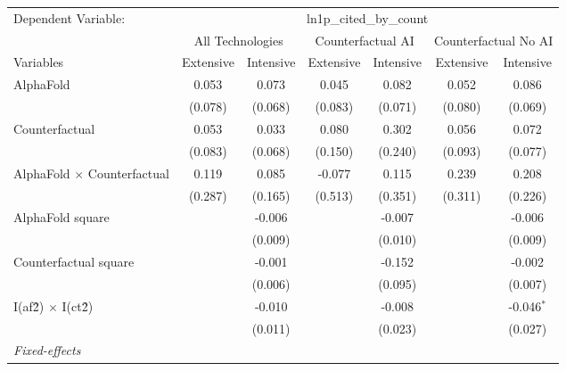 \begingroup
\centering
\begin{tabular}{lcccccc}
   \tabularnewline \midrule \midrule
   Dependent Variable: & \multicolumn{6}{c}{ln1p\_cited\_by\_count}\\
 & \multicolumn{2}{c}{All Technologies} & \multicolumn{2}{c}{Counterfactual AI} & \multicolumn{2}{c}{Counterfactual No AI} \\
\cmidrule(lr){1-1}\cmidrule(lr){2-3} \cmidrule(lr){4-5} \cmidrule(lr){6-7}
Variables & \multicolumn{1}{c}{Extensive} & \multicolumn{1}{c}{Intensive} & \multicolumn{1}{c}{Extensive} & \multicolumn{1}{c}{Intensive} & \multicolumn{1}{c}{Extensive} & \multicolumn{1}{c}{Intensive} \\
\cmidrule(lr){1-1}\cmidrule(lr){2-2} \cmidrule(lr){3-3} \cmidrule(lr){4-4} \cmidrule(lr){5-5} \cmidrule(lr){6-6} \cmidrule(lr){7-7}
   AlphaFold                          & 0.053   & 0.073   & 0.045   & 0.082   & 0.052   & 0.086\\   
                                      & (0.078) & (0.068) & (0.083) & (0.071) & (0.080) & (0.069)\\   
   Counterfactual                     & 0.053   & 0.033   & 0.080   & 0.302   & 0.056   & 0.072\\   
                                      & (0.083) & (0.068) & (0.150) & (0.240) & (0.093) & (0.077)\\   
   AlphaFold $\times$ Counterfactual  & 0.119   & 0.085   & -0.077  & 0.115   & 0.239   & 0.208\\   
                                      & (0.287) & (0.165) & (0.513) & (0.351) & (0.311) & (0.226)\\   
   AlphaFold square                   &         & -0.006  &         & -0.007  &         & -0.006\\   
                                      &         & (0.009) &         & (0.010) &         & (0.009)\\   
   Counterfactual square              &         & -0.001  &         & -0.152  &         & -0.002\\   
                                      &         & (0.006) &         & (0.095) &         & (0.007)\\   
   I(af\^2) $\times$ I(ct\^2)         &         & -0.010  &         & -0.008  &         & -0.046$^{*}$\\   
                                      &         & (0.011) &         & (0.023) &         & (0.027)\\   
   \midrule
   \emph{Fixed-effects}\\

\end{tabular}
